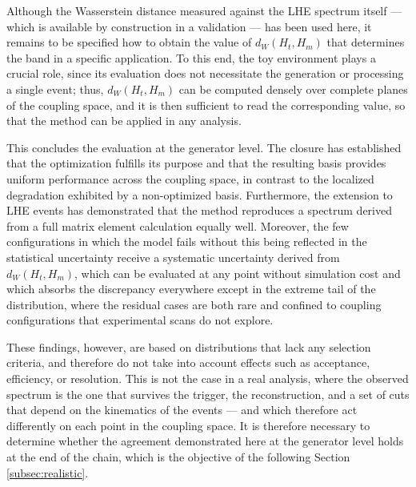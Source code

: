 Although the Wasserstein distance measured against the LHE spectrum itself — which is available by construction in a validation — has been used here, it remains to be specified how to obtain the value of $d_W(H_{t},H_{m})$ that determines the band in a specific application. To this end, the toy environment plays a crucial role, since its evaluation does not necessitate the generation or processing a single event; thus, $d_W(H_{t},H_{m})$ can be computed densely over complete planes of the coupling space, and it is then sufficient to read the corresponding value, so that the method can be applied in any analysis.\medskip

This concludes the evaluation at the generator level. The closure has established that the optimization fulfills its purpose and that the resulting basis provides uniform performance across the coupling space, in contrast to the localized degradation exhibited by a non-optimized basis. Furthermore, the extension to LHE events has demonstrated that the method reproduces a spectrum derived from a full matrix element calculation equally well. Moreover, the few configurations in which the model fails without this being reflected in the statistical uncertainty receive a systematic uncertainty derived from $d_W(H_{t},H_{m})$, which can be evaluated at any point without simulation cost and which absorbs the discrepancy everywhere except in the extreme tail of the distribution, where the residual cases are both rare and confined to coupling configurations that experimental scans do not explore.

These findings, however, are based on distributions that lack any selection criteria, and therefore do not take into account effects such as acceptance, efficiency, or resolution. This is not the case in a real analysis, where the observed spectrum is the one that survives the trigger, the reconstruction, and a set of cuts that depend on the kinematics of the events — and which therefore act differently on each point in the coupling space. It is therefore necessary to determine whether the agreement demonstrated here at the generator level holds at the end of the chain, which is the objective of the following Section \ref{subsec:realistic}.\medskip


